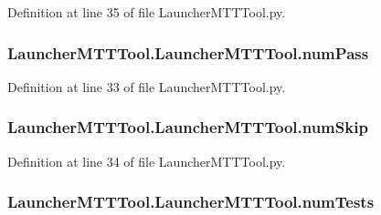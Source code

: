 Definition at line 35 of file Launcher\-M\-T\-T\-Tool.\-py.

\hypertarget{class_launcher_m_t_t_tool_1_1_launcher_m_t_t_tool_a92a3dc1fd9b7d2e9129d3a0968a871eb}{
\subsubsection[{num\-Pass}]{\setlength{\rightskip}{0pt plus 5cm}Launcher\-M\-T\-T\-Tool.\-Launcher\-M\-T\-T\-Tool.\-num\-Pass}}\label{class_launcher_m_t_t_tool_1_1_launcher_m_t_t_tool_a92a3dc1fd9b7d2e9129d3a0968a871eb}


Definition at line 33 of file Launcher\-M\-T\-T\-Tool.\-py.

\hypertarget{class_launcher_m_t_t_tool_1_1_launcher_m_t_t_tool_affd7de54ccbc2c7f78b4afa06728f5e5}{
\subsubsection[{num\-Skip}]{\setlength{\rightskip}{0pt plus 5cm}Launcher\-M\-T\-T\-Tool.\-Launcher\-M\-T\-T\-Tool.\-num\-Skip}}\label{class_launcher_m_t_t_tool_1_1_launcher_m_t_t_tool_affd7de54ccbc2c7f78b4afa06728f5e5}


Definition at line 34 of file Launcher\-M\-T\-T\-Tool.\-py.

\hypertarget{class_launcher_m_t_t_tool_1_1_launcher_m_t_t_tool_a397beae73724893629842d0031c64526}{
\subsubsection[{num\-Tests}]{\setlength{\rightskip}{0pt plus 5cm}Launcher\-M\-T\-T\-Tool.\-Launcher\-M\-T\-T\-Tool.\-num\-Tests}}\label{class_launcher_m_t_t_tool_1_1_launcher_m_t_t_tool_a397beae73724893629842d0031c64526}


